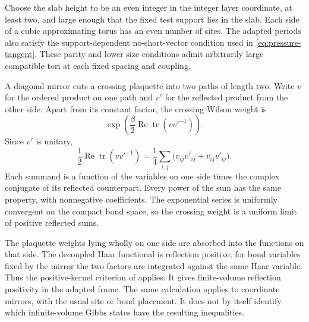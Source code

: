 \documentclass[11pt,letterpaper,reqno]{amsart}
\theoremstyle{definition}
\theoremstyle{remark}
\newcommand{\tr}{\operatorname{tr}}
\begin{document}
Choose the slab height to be an even integer in the
integer layer coordinate, at least two, and large enough
that the fixed test support lies in the slab.
Each side of a cubic approximating torus has an even
number of sites. The adapted periods also satisfy
the support-dependent no-short-vector condition used
in \eqref{eq:pressure-tangent}. These parity and lower
size conditions admit arbitrarily large compatible
tori at each fixed spacing and coupling.

A diagonal mirror cuts a crossing plaquette into two paths of length
two. Write $v$ for the ordered product on one path and $v'$ for the
reflected product from the other side. Apart from its constant
factor, the crossing Wilson weight is
\[
 \exp\!\left(\frac\beta2\operatorname{Re}\tr(vv'^{-1})\right).
\]
Since $v'$ is unitary,
\[
 \frac12\operatorname{Re}\tr(vv'^{-1})
 =\frac14\sum_{i,j}
       \big(v_{ij}\overline{v'_{ij}}
                   +\overline{v_{ij}}v'_{ij}\big).
\]
Each summand is a function of the variables on one side times the
complex conjugate of its reflected counterpart. Every power of the
sum has the same property, with nonnegative coefficients. The
exponential series is uniformly convergent on the compact bond space,
so the crossing weight is a uniform limit of positive reflected sums.

The plaquette weights lying wholly on one side are absorbed into the
functions on that side. The decoupled Haar functional is reflection
positive; for bond variables fixed by the mirror the two factors are
integrated against the same Haar variable. Thus the positive-kernel
criterion of \cite[Theorems~2.1--2.2, pp.~5--6]{FILS1978} applies.
It gives finite-volume reflection positivity in the adapted frame.
The same calculation applies to coordinate mirrors, with the usual
site or bond placement. It does not by itself identify which
infinite-volume Gibbs states have the resulting inequalities.
\end{document}
